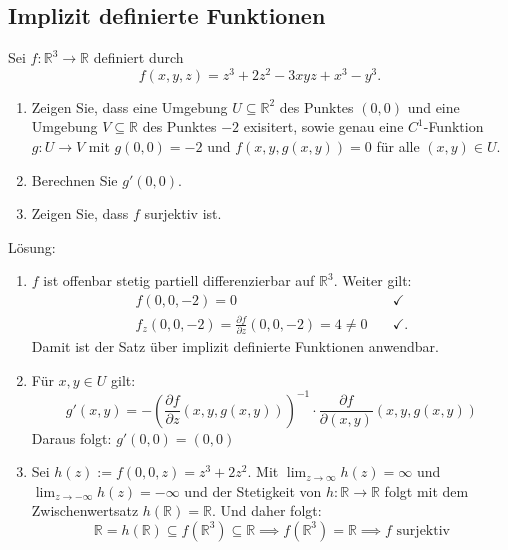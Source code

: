 \subsection{Implizit definierte Funktionen}
Sei $f : \mathbb{R}^3 \to \mathbb{R}$ definiert durch
\begin{displaymath}
  f(x,y,z) = z^3 + 2z^2 - 3xyz + x^3 - y^3.
\end{displaymath}
\begin{enumerate}
    \item Zeigen Sie, dass eine Umgebung $U \subseteq \mathbb{R}^2$ des Punktes $(0,0)$ und eine Umgebung $V \subseteq \mathbb{R}$ des Punktes $-2$ exisitert, sowie genau eine $C^1$-Funktion $g : U \to V$ mit $g(0,0) = -2$ und $f(x,y,g(x,y)) = 0$ für alle $(x,y) \in U$.
    \item Berechnen Sie $g'(0,0)$.
    \item Zeigen Sie, dass $f$ surjektiv ist.
\end{enumerate}
Lösung:
\begin{enumerate}
    \item $f$ ist offenbar stetig partiell differenzierbar auf $\mathbb{R}^3$.
    Weiter gilt:
    \begin{align*}
      f(0,0,-2) = 0 &\quad \checkmark\\
      f_z(0,0,-2) = \frac{\partial f}{\partial z} (0,0,-2) = 4 \neq 0 &\quad \checkmark.
    \end{align*}
    Damit ist der Satz über implizit definierte Funktionen anwendbar.
    \item Für $x,y \in U$ gilt:
    \begin{displaymath}
      g'(x,y) = -\left(\frac{\partial f}{\partial z} (x,y,g(x,y))\right)^{-1} \cdot \frac{\partial f}{\partial (x,y)} (x,y,g(x,y))
    \end{displaymath}
    Daraus folgt: $g'(0,0) = (0,0)$
    \item Sei $h(z) := f(0,0,z) = z^3 + 2z^2$. Mit $\lim_{z \to \infty} h(z) = \infty$ und $\lim_{z \to -\infty} h(z) = -\infty$ und der Stetigkeit von $h : \mathbb{R} \to \mathbb{R}$ folgt mit dem Zwischenwertsatz $h(\mathbb{R}) = \mathbb{R}$.
    Und daher folgt:
    \begin{displaymath}
      \mathbb{R} = h(\mathbb{R}) \subseteq f(\mathbb{R}^3) \subseteq \mathbb{R} \implies f(\mathbb{R}^3) = \mathbb{R} \implies f \text{ surjektiv}
    \end{displaymath}
\end{enumerate}

